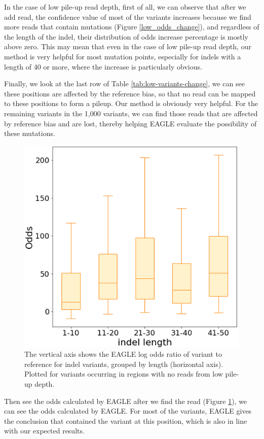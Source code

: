 In the case of low pile-up read depth, first of all, we can observe that after we add read, the confidence value of most of the variants increases because we find more reads that contain mutations (Figure \ref{low_odds_change}), and regardless of the length of the indel, their distribution of odds increase percentage is mostly above zero.
This may mean that even in the case of low pile-up read depth, our method is very helpful for most mutation points, especially for indels with a length of 40 or more, where the increase is particularly obvious.

Finally, we look at the last row of Table \ref{tab:low-variants-change}, we can see these positions are affected by the reference bias, so that no read can be mapped to these positions to form a pileup. Our method is obviously very helpful. For the remaining variants in the 1,000 variants, we can find those reads that are affected by reference bias and are lost, thereby helping EAGLE evaluate the possibility of these mutations.

\vspace{0.5cm}
\begin{figure}[H]
    \centering
    \includegraphics[width=0.6\columnwidth]{body/image/low_new_odds.png}
    \captionsetup{labelfont=bf}
    \renewcommand{\baselinestretch}{1.0}
    \caption[no reads with variants from low pile-up depth odds ratio]{The vertical axis shows the EAGLE log odds ratio of variant to reference for indel variants, grouped by length (horizontal axis).  Plotted for variants occurring in regions with no reads from low pile-up depth.}
    \label{low_new_odds}
\end{figure}

Then see the odds calculated by EAGLE after we find the read (Figure \ref{low_new_odds}), we can see the odds calculated by EAGLE. For most of the variants, EAGLE gives the conclusion that contained the variant at this position, which is also in line with our expected results.


